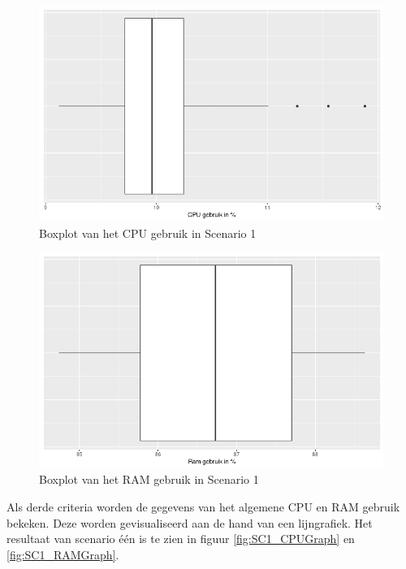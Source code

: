 %
\begin{figure}[h]
	\centering
	\includegraphics[width=0.75\linewidth]{img/SC1_CPUBox.png}
	\caption{Boxplot van het CPU gebruik in Scenario 1}
	\label{fig:SC1_CPUBox}
\end{figure}

\begin{figure}[h]
	\centering
	\includegraphics[width=0.75\linewidth]{img/SC1_RAMBox.png}
	\caption{Boxplot van het RAM gebruik in Scenario 1}
	\label{fig:SC1_RAMBox}
\end{figure}

Als derde criteria worden de gegevens van het algemene CPU en RAM gebruik bekeken. Deze worden gevisualiseerd aan de hand van een lijngrafiek. Het resultaat van scenario één is te zien in figuur \ref{fig:SC1_CPUGraph} en \ref{fig:SC1_RAMGraph}.

